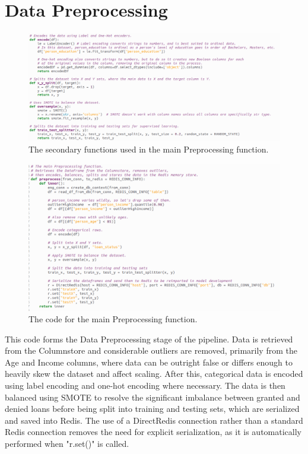 \documentclass[12pt]{report}
\newcommand{\para}{\vspace{7pt}\noindent}
\begin{document}
\section{Data Preprocessing}\label{sec:ImpPreprocessing}

\begin{figure}[H]
    \centering
    \includegraphics[width=\linewidth]{Implementation/.Code/PipelineFunctions/Preprocessing1.png}
    \caption{The secondary functions used in the main Preprocessing function.}
    \label{fig:PreprocessingCode1}
\end{figure}

\begin{figure}[H]
    \centering
    \includegraphics[width=\linewidth]{Implementation/.Code/PipelineFunctions/Preprocessing2.png}
    \caption{The code for the main Preprocessing function.}
    \label{fig:PreprocessingCode2}
\end{figure}

\para This code forms the Data Preprocessing stage of the pipeline. Data is retrieved from the 
Columnstore and considerable outliers are removed, primarily from the Age and Income columns, 
where data can be outright false or differs enough to heavily skew the dataset and affect scaling.
After this, categorical data is encoded using label encoding and one-hot encoding where necessary.
The data is then balanced using SMOTE to resolve the significant imbalance between granted and denied loans 
before being split into training and testing sets, which are serialized and saved into Redis. The use of 
a DirectRedis connection rather than a standard Redis connection removes the need for explicit serialization, 
as it is automatically performed when "r.set()" is called. 
\end{document}
